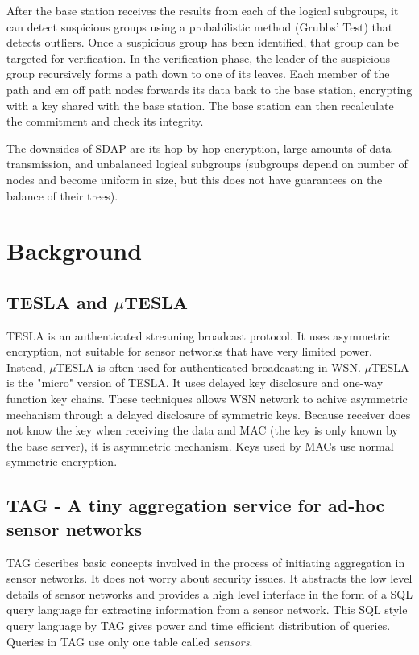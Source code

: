 \documentclass[a4paper]{article}
\begin{document}
After the base station receives the results from each of the logical
subgroups, it can detect suspicious groups using a probabilistic method
(Grubbs' Test) \cite{Grubb} that detects outliers. Once a suspicious group has
been identified, that group can be targeted for verification. In the
verification phase, the leader of the suspicious group recursively forms a
path down to one of its leaves. Each member of the path and {em off path
  nodes} forwards its data back to the base station, encrypting with a key
shared with the base station. The base station can then recalculate the
commitment and check its integrity.

The downsides of SDAP are its hop-by-hop encryption, large amounts of
data transmission, and unbalanced logical subgroups (subgroups
depend on number of nodes and become uniform in size, but this does
not have guarantees on the balance of their trees).



\section{Background}
\label{sec:background}
\subsection{TESLA and $\mu$TESLA}

TESLA is an authenticated streaming broadcast protocol. It uses asymmetric
encryption, not suitable for sensor networks that have very limited
power. Instead, $\mu$TESLA is often used for authenticated broadcasting in
WSN. $\mu$TESLA is the "micro" version of TESLA. It uses delayed key
disclosure and one-way function key chains. These techniques allows WSN
network to achive asymmetric mechanism through a delayed disclosure of
symmetric keys. Because receiver does not know the key when receiving the data
and MAC (the key is only known by the base server), it is asymmetric
mechanism. Keys used by MACs use normal symmetric encryption.


\subsection{TAG - A tiny aggregation service for ad-hoc sensor networks}

TAG describes basic concepts involved in the process of initiating aggregation
in sensor networks. It does not worry about security issues. It abstracts the
low level details of sensor networks and provides a high level interface in
the form of a SQL query language for extracting information from a sensor
network. This SQL style query language by TAG gives power and time efficient
distribution of queries. Queries in TAG use only one table called {\em
  sensors}.
\end{document}
